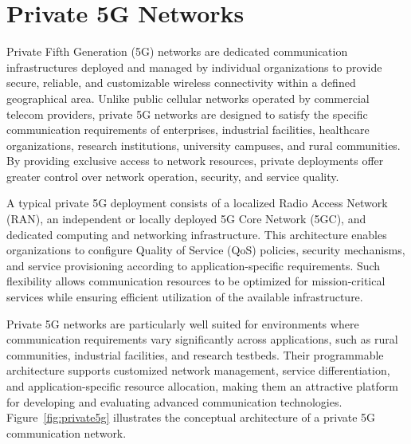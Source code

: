 \documentclass[12pt,a4paper]{report}
\begin{document}
	\section{Private 5G Networks}
	\label{sec:private5g}
	
	Private Fifth Generation (5G) networks are dedicated communication infrastructures deployed and managed by individual organizations to provide secure, reliable, and customizable wireless connectivity within a defined geographical area. Unlike public cellular networks operated by commercial telecom providers, private 5G networks are designed to satisfy the specific communication requirements of enterprises, industrial facilities, healthcare organizations, research institutions, university campuses, and rural communities. By providing exclusive access to network resources, private deployments offer greater control over network operation, security, and service quality.
	
	A typical private 5G deployment consists of a localized Radio Access Network (RAN), an independent or locally deployed 5G Core Network (5GC), and dedicated computing and networking infrastructure. This architecture enables organizations to configure Quality of Service (QoS) policies, security mechanisms, and service provisioning according to application-specific requirements. Such flexibility allows communication resources to be optimized for mission-critical services while ensuring efficient utilization of the available infrastructure.
	
	Private 5G networks are particularly well suited for environments where communication requirements vary significantly across applications, such as rural communities, industrial facilities, and research testbeds. Their programmable architecture supports customized network management, service differentiation, and application-specific resource allocation, making them an attractive platform for developing and evaluating advanced communication technologies. Figure~\ref{fig:private5g} illustrates the conceptual architecture of a private 5G communication network.
	
	
	
\end{document}
